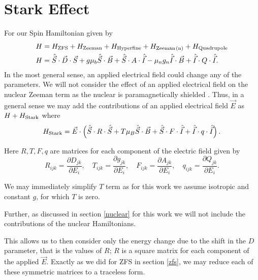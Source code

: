 \section{Stark Effect}
For our Spin Hamiltonian given by 
\begin{equation}
    \begin{align}
        H &= H_{\ce{ZFS}} + H_{\ce{Zeeman}} + H_{\ce{Hyperfine}} + H_{\ce{Zeeman(n)}}+ H_{\ce{Quadrupole}}\\ 
        H &= \hat{\vec{S}}\cdot{\vec{D}}\cdot{\vec{S}} + g\mu_b \hat{\vec{S}}\cdot \vec{B}  + \hat{\vec{S}}\cdot A \cdot \hat{\vec{I}}  -  \mu_n g_n \hat{\vec{I}}\cdot\vec{B} + \hat{\vec{I}} \cdot Q \cdot \hat{\vec{I}}.
    \end{align}
\end{equation}
In the most general sense, an applied electrical field could change any of the parameters. We will not consider the effect of an applied electrical field on the nuclear Zeeman term as the nuclear is paramagnetically shielded . Thus, in a general sense we may add the contributions of an applied electrical field $\vec{E}$ as $H + H_{\ce{Stark}}$ where 
\begin{equation}
    H_{\ce{Stark}} = \vec{E}\cdot\left(\hat{\vec{S}}\cdot R \cdot \hat{\vec{S}} + T \mu_B \hat{\vec{S}}\cdot \vec{B} + \hat{\vec{S}}\cdot F \cdot \hat{\vec{I}} + \hat{\vec{I}} \cdot q \cdot \hat{\vec{I}} \right). 
    \label{eq:}
\end{equation}%

Here $R, T, F, q$ are matrices for each component of the electric field given by 
\begin{equation}
    R_{ijk} = \frac{\partial D_{jk}}{\partial E_i}, \quad 
    T_{ijk} = \frac{\partial g_{jk}}{\partial E_i}, \quad 
    F_{ijk} = \frac{\partial A_{jk}}{\partial E_i}, \quad 
    q_{ijk} = \frac{\partial Q_{jk}}{\partial E_i}.
    \label{eq:}
\end{equation}

We may immediately simplify $T$ term as for this work we assume isotropic and constant $g$, for which $T$ is zero.  

Further, as discussed in section \ref{nuclear} for this work we will not include the contributions of the nuclear Hamiltonians. 

This allows us to then consider only the energy change due to the shift in the $D$ parameter, that is the values of $R$; $R$ is a square matrix for each component of the applied $\vec{E}$. 
Exactly as we did for ZFS in section \ref{zfs}, we may reduce each of these symmetric matrices to a traceless form. 

